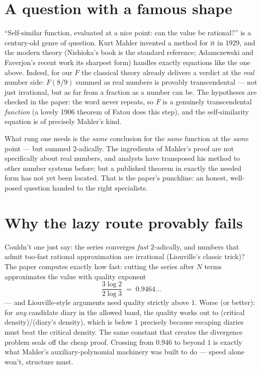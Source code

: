 \documentclass[11pt]{article}
\begin{document}
\section{A question with a famous shape}

``Self-similar function, evaluated at a nice point: can the value be
rational?'' is a century-old genre of question. Kurt Mahler invented
a method for it in 1929, and the modern theory (Nishioka's book is
the standard reference; Adamczewski and Faverjon's recent work its
sharpest form) handles exactly equations like the one above. Indeed,
for our $F$ the classical theory already delivers a verdict at the
\emph{real} number side: $F(8/9)$ summed as real numbers is provably
transcendental --- not just irrational, but as far from a fraction as
a number can be. The hypotheses are checked in the paper: the word
never repeats, so $F$ is a genuinely transcendental \emph{function}
(a lovely 1906 theorem of Fatou does this step), and the
self-similarity equation is of precisely Mahler's kind.

What rung one needs is the \emph{same} conclusion for the \emph{same}
function at the \emph{same} point --- but summed $2$-adically. The
ingredients of Mahler's proof are not specifically about real
numbers, and analysts have transposed his method to other number
systems before; but a published theorem in exactly the needed form
has not yet been located. That is the paper's punchline: an honest,
well-posed question handed to the right specialists.

\section{Why the lazy route provably fails}

Couldn't one just say: the series converges \emph{fast}
$2$-adically, and numbers that admit too-fast rational approximation
are irrational (Liouville's classic trick)? The paper computes
exactly how fast: cutting the series after $N$ terms approximates the
value with quality exponent
\[
\frac{3\log 2}{2\log 3} \;=\; 0.9464\ldots
\]
--- and Liouville-style arguments need quality strictly above $1$.
Worse (or better): for \emph{any} candidate diary in the allowed
band, the quality works out to (critical density)/(diary's density),
which is below $1$ precisely because escaping diaries must beat the
critical density. The same constant that creates the divergence
problem seals off the cheap proof. Crossing from $0.946$ to beyond
$1$ is exactly what Mahler's auxiliary-polynomial machinery was built
to do --- speed alone won't, structure must.
\end{document}
